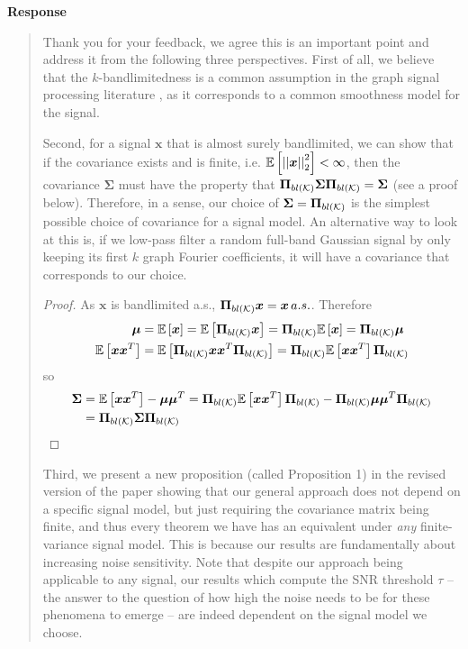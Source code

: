 \documentclass[11pt,onecolumn,journal]{IEEEtran}
\newcommand{\matr}[1]{\bm{#1}}
\newcommand{\vect}[1]{\bm{#1}}
\theoremstyle{definition}
\newcommand{\sqnormvec}[1]{\left\lvert\left\lvert#1\right\rvert\right\rvert^{2}_{2}}
\begin{document}
\textbf{Response}
\begin{quote}
Thank you for your feedback, we agree this is an important point and address it from the following three perspectives. First of all, we believe that the $k$-bandlimitedness is a common assumption in the graph signal processing literature \cite{wang2018optimal, wang2019low,bai2020fast, puy2018random, tremblay2017determinantal}, as it corresponds to a common smoothness model for the signal.


Second, for a signal $\vect{x}$ that is almost surely bandlimited, we can show that if the covariance exists and is finite, i.e. $\expect{\sqnormvec{\vect{x}}} < \infty$, then the covariance $\matr{\Sigma}$ must have the property that $\projbl\matr{\Sigma}\projbl = \matr{\Sigma}$ (see a proof below). Therefore, in a sense, our choice of $\matr{\Sigma} = \projbl$ is the simplest possible choice of covariance for a signal model. An alternative way to look at this is, if we low-pass filter a random full-band Gaussian signal by only keeping its first $k$ graph Fourier coefficients, it will have a covariance that corresponds to our choice.
\begin{proof}
 As $\vect{x}$ is bandlimited a.s., $ \projbl\vect{x} = \vect{x} \,  a.s.$. Therefore 
 \begin{align}
 \vect{\mu} &= \expect{\vect{x}} = \expect{\projbl\vect{x}} = \projbl\expect{\vect{x}} = \projbl\vect{\mu} \\
 \expect{\vect{x}\vect{x}^{T}} &= \expect{\projbl\vect{x}\vect{x}^{T}\projbl}
 = \projbl \expect{\vect{x}\vect{x}^{T}}\projbl 
 \end{align}
so
 \begin{align}
 \matr{\Sigma} &= \expect{\vect{x}\vect{x}^{T}} - \vect{\mu}\vect{\mu}^{T} = \projbl\expect{\vect{x}\vect{x}^{T}}\projbl - \projbl\vect{\mu}\vect{\mu}^{T}\projbl \\&= \projbl\matr{\Sigma}\projbl
 \end{align}
\end{proof}

Third, we present a new proposition (called Proposition 1) in the revised version of the paper showing that our general approach does not depend on a specific signal model, but just requiring the covariance matrix being finite, and thus every theorem we have has an equivalent under \emph{any} finite-variance signal model. This is because our results are fundamentally about increasing noise sensitivity. Note that despite our approach being applicable to any signal, our results which compute the SNR threshold $\tau$ -- the answer to the question of how high the noise needs to be for these phenomena to emerge -- are indeed dependent on the signal model we choose.



\end{quote}
\end{document}
